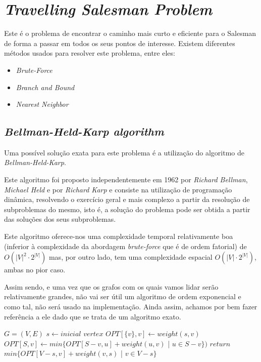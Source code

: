 \documentclass[12pt,a4paper]{report}
\begin{document}
	
	\section{\textit{Travelling Salesman Problem}}
	Este é o problema de encontrar o caminho mais curto e eficiente para o Salesman de forma a passar em todos os seus pontos de interesse. Existem diferentes métodos usados para resolver este problema, entre eles:
	\begin{itemize}
		\item \textit{Brute-Force}
		\item \textit{Branch and Bound}
		\item \textit{Nearest Neighbor}
	\end{itemize}

		\subsection{\textit{Bellman-Held-Karp algorithm}}
		Uma possível solução exata para este problema é a utilização do algoritmo de \textit{Bellman-Held-Karp}. \par
		Este algoritmo foi proposto independentemente em 1962 por \textit{Richard Bellman}, \textit{Michael Held} e por \textit{Richard Karp} e consiste na utilização de programação dinâmica, resolvendo o exercício geral e mais complexo a partir da resolução de subproblemas do mesmo, isto é, a solução do problema pode ser obtida a partir das soluções dos seus subproblemas. \par
		Este algoritmo oferece-nos uma complexidade temporal relativamente boa (inferior à complexidade da abordagem \textit{brute-force} que é de ordem fatorial) de \( O(|V|^2 \cdot 2^{|V|})\) mas, por outro lado, tem uma complexidade espacial \( O(|V| \cdot 2^{|V|})\), ambas no pior caso. \cite{bellmanheldkarp} \par
		Assim sendo, e uma vez que os grafos com os quais vamos lidar serão relativamente grandes, não vai ser útil um algoritmo de ordem exponencial e como tal, não será usado na implementação. Ainda assim, achamos por bem fazer referência a ele dado que se trata de um algoritmo exato.

		\begin{center}
			\begin{algorithmic}[1]
				\State $G = (V, E)$
				\newline
				\State $s \leftarrow inicial$ $vertex$
					\State $OPT[\{v\}, v] \leftarrow weight(s,v)$
				\EndFor
							\State $ OPT[S,v] \leftarrow min\{OPT[S - v, u] + weight(u, v)$ | $u \in S - v \})$
						\EndFor
					\EndFor
				\EndFor
				\State $return$ $min\{ OPT[V - s, v] + weight(v, s)$ | $v \in V - s \} $
				\EndFunction
			\end{algorithmic}
		\end{center}
\end{document}
